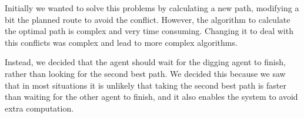 Initially we wanted to solve this problems by calculating a new path, modifying a bit the planned route to avoid the conflict. However, the algorithm to calculate the optimal path is complex and very time consuming. Changing it to deal with this conflicts was complex and lead to more complex algorithms. 

Instead, we decided that the agent should wait for the digging agent to finish, rather than looking for the second best path. We decided this because we saw that in most situations it is unlikely that taking the second best path is faster than waiting for the other agent to finish, and it also enables the system to avoid extra computation.


